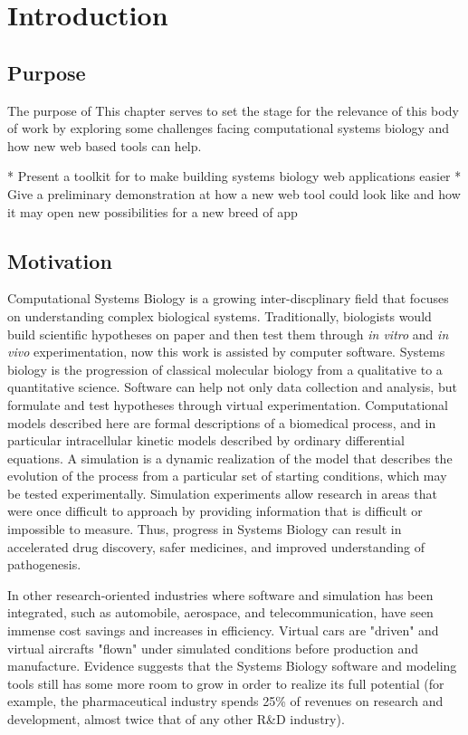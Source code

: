\chapter{Introduction}

\section{Purpose}
The purpose of 
This chapter serves to set the stage for the relevance of this body of work by exploring some challenges facing computational systems biology and how new web based tools can help.

* Present a toolkit for to make building systems biology web applications easier
* Give a preliminary demonstration at how a new web tool could look like and how it may open new possibilities for a new breed of app

\section{Motivation}

Computational Systems Biology is a growing inter-discplinary field that focuses on understanding complex biological systems. \autocite{kitano2002computational}
Traditionally, biologists would build scientific hypotheses on paper and then test them through \textit{in vitro} and \textit{in vivo} experimentation, now this work is assisted by computer software.
Systems biology is the progression of classical molecular biology from a qualitative to a quantitative science.
Software can help not only data collection and analysis, but formulate and test hypotheses through virtual experimentation.
Computational models described here are formal descriptions of a biomedical process, and in particular intracellular kinetic models described by ordinary differential equations.
A simulation is a dynamic realization of the model that describes the evolution of the process from a particular set of starting conditions, which may be tested experimentally.
Simulation experiments allow research in areas that were once difficult to approach by providing information that is difficult or impossible to measure. \autocite{edwards2001silico}
Thus, progress in Systems Biology can result in accelerated drug discovery, safer medicines, and improved understanding of pathogenesis. \autocite{kitano2010grand, mack2004can}

In other research-oriented industries where software and simulation has been integrated, such as automobile, aerospace, and telecommunication, have seen immense cost savings and increases in efficiency.
Virtual cars are "driven" and virtual aircrafts "flown" under simulated conditions before production and manufacture. \autocite{ghosh2010connecting}
Evidence suggests that the Systems Biology software and modeling tools still has some more room to grow in order to realize its full potential (for example, the pharmaceutical industry spends 25\% of revenues on research and development, almost twice that of any other R\&D industry). \autocite{economist2005models}

